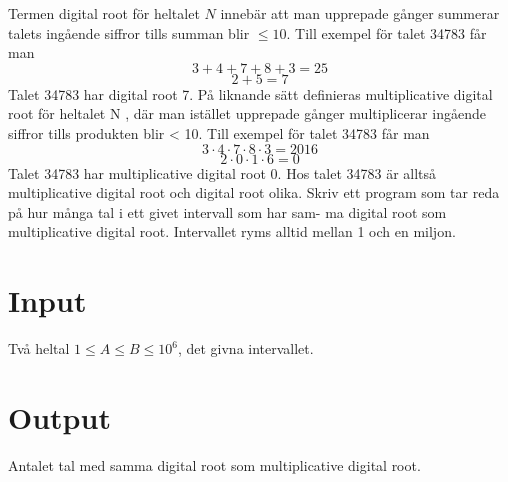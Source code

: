 Termen digital root för heltalet $N$ innebär att man upprepade gånger summerar talets
ingående siffror tills summan blir $\le 10$. Till exempel för talet 34783 får man
$$3 + 4 + 7 + 8 + 3 = 25$$
$$2+5=7$$
Talet 34783 har digital root 7.
På liknande sätt definieras multiplicative digital root för heltalet N , där man istället
upprepade gånger multiplicerar ingående siffror tills produkten blir < 10. Till exempel
för talet 34783 får man
$$3 \cdot 4 \cdot 7 \cdot 8 \cdot 3 = 2016$$
$$2 \cdot 0 \cdot 1 \cdot 6 = 0$$
Talet 34783 har multiplicative digital root 0. Hos talet 34783 är alltså multiplicative
digital root och digital root olika.
Skriv ett program som tar reda på hur många tal i ett givet intervall som har sam-
ma digital root som multiplicative digital root. Intervallet ryms alltid mellan 1 och en
miljon.

\section*{Input}
Två heltal $1 \le A \le B \le 10^6$, det givna intervallet.

\section*{Output}
Antalet tal med samma digital root som multiplicative digital root.